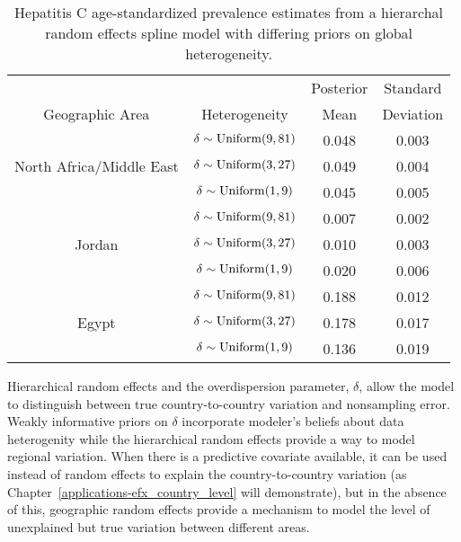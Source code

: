     \begin{table}[h]
        \begin{center}
        \begin{tabular}{|c|c|c|c|}
            \hline
                & & Posterior & Standard \\
                Geographic Area & Heterogeneity & Mean & Deviation \\
            \hline
                & $\delta \sim \operatorname{Uniform}(9,81)$ & 0.048 & 0.003 \\
                North Africa/Middle East & $\delta \sim \operatorname{Uniform}(3,27)$ & 0.049 & 0.004 \\
                & $\delta \sim \operatorname{Uniform}(1,9)$ & 0.045 & 0.005 \\
            \hline
                & $\delta \sim \operatorname{Uniform}(9,81)$ & 0.007 & 0.002 \\
                Jordan & $\delta \sim \operatorname{Uniform}(3,27)$ & 0.010 & 0.003 \\
                & $\delta \sim \operatorname{Uniform}(1,9)$ & 0.020 & 0.006 \\
            \hline
                & $\delta \sim \operatorname{Uniform}(9,81)$ & 0.188 & 0.012 \\
                Egypt & $\delta \sim \operatorname{Uniform}(3,27)$ & 0.178 & 0.017 \\
                & $\delta \sim \operatorname{Uniform}(1,9)$ & 0.136 & 0.019 \\
            \hline
        \end{tabular}
        \end{center}
        \caption{ Hepatitis C age-standardized prevalence estimates
          from a hierarchal random effects spline model with differing
          priors on global heterogeneity.}
        \label{tab:app-hepc global rfx}
    \end{table}

Hierarchical random effects and the overdispersion parameter,
$\delta$, allow the model to distinguish between true
country-to-country variation and nonsampling error.  Weakly
informative priors on $\delta$ incorporate modeler's beliefs about
data heterogenity while the hierarchical random effects provide a way
to model regional variation.  When there is a predictive covariate
available, it can be used instead of random effects to explain the
country-to-country variation (as
Chapter~\ref{applications-efx_country_level} will demonstrate), but in
the absence of this, geographic random effects provide a mechanism to
model the level of unexplained but true variation between different
areas.

